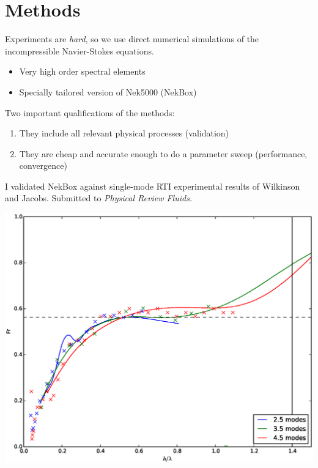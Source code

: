 \documentclass[12pt]{beamer}
\begin{document}
\section{Methods}

\begin{frame}
Experiments are \textit{hard}, so we use direct numerical simulations
of the incompressible Navier-Stokes equations.
\begin{itemize}
  \item Very high order spectral elements
  \item Specially tailored version of Nek5000 (NekBox)
\end{itemize}
\vspace{20pt}\pause

Two important qualifications of the methods:
\begin{enumerate}
  \item They include all relevant physical processes (validation)
  \item They are cheap and accurate enough to do a parameter sweep (performance, convergence)
\end{enumerate}
\end{frame}

\begin{frame}
I validated NekBox against single-mode RTI experimental results of Wilkinson and Jacobs.
Submitted to \textit{Physical Review Fluids.}
\begin{center}
\includegraphics[height=0.9\textheight]{graphics/Fr.eps}
\end{center}
\end{frame}
\end{document}
